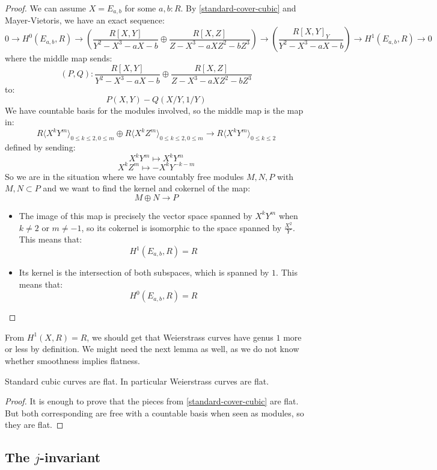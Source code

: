\begin{proof}
We can assume $X = E_{a,b}$ for some $a,b:R$. By \cref{standard-cover-cubic} and Mayer-Vietoris, we have an exact sequence:
\[0 \to H^0(E_{a,b},R) \to \left(\frac{R[X,Y]}{Y^2-X^3-aX-b} \oplus \frac{R[X,Z]}{Z-X^3-aXZ^2-bZ^3}\right) \to \left(\frac{R[X,Y]_Y}{Y^2-X^3-aX-b}\right) \to H^1(E_{a,b},R)\to 0 \] 
where the middle map sends:
\[(P,Q) : \frac{R[X,Y]}{Y^2-X^3-aX-b} \oplus \frac{R[X,Z]}{Z-X^3-aXZ^2-bZ^3}\]
to:
\[P(X,Y) - Q(X/Y,1/Y)\]
We have countable basis for the modules involved, so the middle map is the map in:
\[R\langle X^kY^m\rangle_{0\leq k\leq 2,0\leq m} \oplus R\langle X^kZ^m\rangle_{0\leq k\leq 2,0\leq m} \to R\langle X^kY^m\rangle_{0\leq k\leq 2}\]
defined by sending:
\[X^kY^m \mapsto X^kY^m\]
\[X^kZ^m \mapsto -X^kY^{-k-m}\]
So we are in the situation where we have countably free modules $M,N,P$ with $M,N\subset P$ and we want to find the kernel and cokernel of the map:
\[M\oplus N \to P\]
\begin{itemize}
\item The image of this map is precisely the vector space spanned by $X^kY^m$ when $k\not=2$ or $m\not=-1$, so its cokernel is isomorphic to the space spanned by $\frac{X^2}{Y}$. This means that:
\[H^1(E_{a,b},R) = R\]
\item Its kernel is the intersection of both subspaces, which is spanned by $1$. This means that:
\[H^0(E_{a,b},R) = R\]
\end{itemize}
\end{proof}

From $H^1(X,R) = R$, we should get that Weierstrass curves have genus $1$ more or less by definition. We might need the next lemma as well, as we do not know whether smoothness implies flatness.

\begin{lemma}
Standard cubic curves are flat. In particular Weierstrass curves are flat.
\end{lemma}

\begin{proof}
It is enough to prove that the pieces from \cref{standard-cover-cubic} are flat. But both corresponding are free with a countable basis when seen as modules, so they are flat.
\end{proof}

\subsection{The $j$-invariant}

